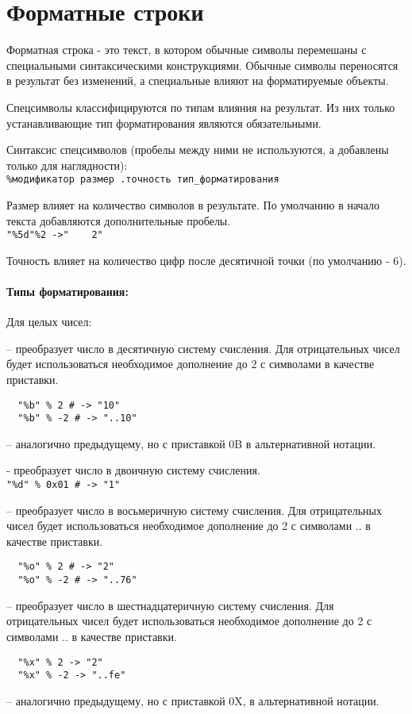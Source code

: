 \hypertarget{appformat}{}
\chapter{Форматные строки}

Форматная строка - это текст, в котором обычные символы перемешаны с специальными синтаксическими конструкциями. Обычные символы переносятся в результат без изменений, а специальные влияют на форматируемые объекты.

Спецсимволы классифицируются по типам влияния на результат. Из них только устанавливающие тип форматирования являются обязательными.

Синтаксис спецсимволов (пробелы между ними не используются, а добавлены только для наглядности):
\\\verb!%модификатор размер .точность тип_форматирования!

Размер влияет на количество символов в результате. По умолчанию в начало текста добавляются дополнительные пробелы.
\\\verb!"%5d"%2 ->"    2"!

Точность влияет на количество цифр после десятичной точки (по умолчанию - 6).

\subsubsection*{Типы форматирования:}

\begin{keylist}{Для целых чисел:}

   – преобразует число в десятичную систему счисления. Для отрицательных чисел будет использоваться необходимое дополнение до 2 с символами  в качестве приставки.
  \begin{verbatim}
  "%b" % 2 # -> "10"
  "%b" % -2 # -> "..10"
  \end{verbatim}
  
   – аналогично предыдущему, но с приставкой 0B в альтернативной нотации.
  
   - преобразует число в двоичную систему счисления.
  \\\verb!"%d" % 0x01 # -> "1"!
  
   – преобразует число в восьмеричную систему счисления. Для отрицательных чисел будет использоваться необходимое дополнение до 2 с символами .. в качестве приставки.
  \begin{verbatim}
  "%o" % 2 # -> "2"
  "%o" % -2 # -> "..76"
  \end{verbatim}
  
   – преобразует число в шестнадцатеричную систему счисления. Для отрицательных чисел будет использоваться необходимое дополнение до 2 с символами .. в качестве приставки.
  \begin{verbatim}
  "%x" % 2 -> "2"
  "%x" % -2 -> "..fe"
  \end{verbatim}
  
   – аналогично предыдущему, но с приставкой 0X,  в альтернативной нотации.
\end{keylist}

